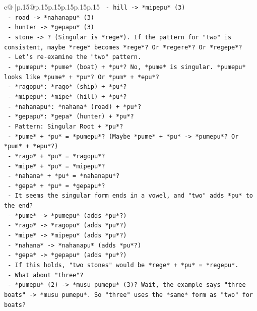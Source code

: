 \documentclass{article}
\begin{document}
{\begin{supertabular}{c@{$\;$}|p{.15\linewidth}@{}p{.15\linewidth}p{.15\linewidth}p{.15\linewidth}p{.15\linewidth}p{.15\linewidth}}
{{{\texttt{    {-} hill {-}> *mipepu* (3)} \\
\texttt{    {-} road {-}> *nahanapu* (3)} \\
\texttt{    {-} hunter {-}> *gepapu* (3)} \\
\texttt{    {-} stone {-}> ? (Singular is *rege*). If the pattern for "two" is consistent, maybe *rege* becomes *rege*? Or *regere*? Or *regepe*?} \\
\texttt{    {-} Let's re{-}examine the "two" pattern.} \\
\texttt{      {-} *pumepu*: *pume* (boat) + *pu*? No, *pume* is singular. *pumepu* looks like *pume* + *pu*? Or *pum* + *epu*?} \\
\texttt{      {-} *ragopu*: *rago* (ship) + *pu*?} \\
\texttt{      {-} *mipepu*: *mipe* (hill) + *pu*?} \\
\texttt{      {-} *nahanapu*: *nahana* (road) + *pu*?} \\
\texttt{      {-} *gepapu*: *gepa* (hunter) + *pu*?} \\
\texttt{      {-} Pattern: Singular Root + *pu*?} \\
\texttt{        {-} *pume* + *pu* = *pumepu*? (Maybe *pume* + *pu* {-}> *pumepu*? Or *pum* + *epu*?)} \\
\texttt{        {-} *rago* + *pu* = *ragopu*?} \\
\texttt{        {-} *mipe* + *pu* = *mipepu*?} \\
\texttt{        {-} *nahana* + *pu* = *nahanapu*?} \\
\texttt{        {-} *gepa* + *pu* = *gepapu*?} \\
\texttt{      {-} It seems the singular form ends in a vowel, and "two" adds *pu* to the end?} \\
\texttt{        {-} *pume* {-}> *pumepu* (adds *pu*?)} \\
\texttt{        {-} *rago* {-}> *ragopu* (adds *pu*?)} \\
\texttt{        {-} *mipe* {-}> *mipepu* (adds *pu*?)} \\
\texttt{        {-} *nahana* {-}> *nahanapu* (adds *pu*?)} \\
\texttt{        {-} *gepa* {-}> *gepapu* (adds *pu*?)} \\
\texttt{      {-} If this holds, "two stones" would be *rege* + *pu* = *regepu*.} \\
\texttt{      {-} What about "three"?} \\
\texttt{        {-} *pumepu* (2) {-}> *musu pumepu* (3)? Wait, the example says "three boats" {-}> *musu pumepu*. So "three" uses the *same* form as "two" for boats?} \\
}}}
\end{supertabular}}
\end{document}
